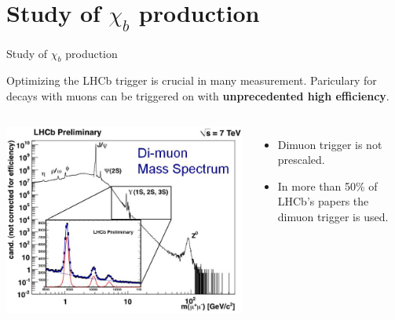 \documentclass{beamer}
\begin{document}
\section{Study of $\chi_{b}$ production}
\begin{frame}
\begin{exampleblock}{}
    \begin{center}
        {\huge Study of $\chi_{b}$ production}
    \end{center}
\end{exampleblock}
\end{frame}
\begin{frame}
Optimizing the LHCb trigger is crucial in many measurement. Pariculary for
decays with muons can be triggered on
with \textbf{unprecedented high efficiency}.
\begin{columns}[c]
\includegraphics[width=\textwidth]{images/mumu.png}
\begin{itemize}
  \item Dimuon trigger is not prescaled.
  \item In more than 50\% of LHCb's papers the dimuon trigger is used.
\end{itemize}
\end{columns}
\end{frame}
\end{document}
